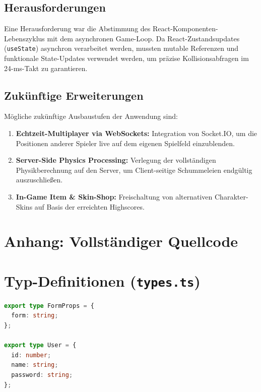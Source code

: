 \documentclass[12pt,a4paper]{article}
\begin{document}
\subsection{Herausforderungen}
Eine Herausforderung war die Abstimmung des React-Komponenten-Lebenszyklus mit dem asynchronen Game-Loop. Da React-Zustandsupdates (\texttt{useState}) asynchron verarbeitet werden, mussten mutable Referenzen und funktionale State-Updates verwendet werden, um präzise Kollisionsabfragen im 24-ms-Takt zu garantieren.

\subsection{Zukünftige Erweiterungen}
Mögliche zukünftige Ausbaustufen der Anwendung sind:
\begin{enumerate}
  \item \textbf{Echtzeit-Multiplayer via WebSockets:} Integration von Socket.IO, um die Positionen anderer Spieler live auf dem eigenen Spielfeld einzublenden.
  \item \textbf{Server-Side Physics Processing:} Verlegung der vollständigen Physikberechnung auf den Server, um Client-seitige Schummeleien endgültig auszuschließen.
  \item \textbf{In-Game Item \& Skin-Shop:} Freischaltung von alternativen Charakter-Skins auf Basis der erreichten Highscores.
\end{enumerate}

\newpage
\appendix
\section*{Anhang: Vollständiger Quellcode}

\section{Typ-Definitionen (\texttt{types.ts})}
\begin{lstlisting}[language=TypeScript, caption={types.ts}]
export type FormProps = {
  form: string;
};

export type User = {
  id: number;
  name: string;
  password: string;
};
\end{lstlisting}
\end{document}
